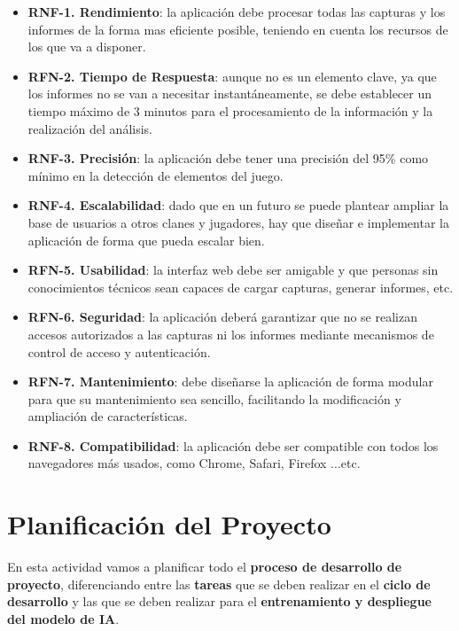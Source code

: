 \begin{itemize}
	\item \textbf{RNF-1. Rendimiento}: la aplicación debe procesar todas las capturas y los informes de la forma mas eficiente posible, teniendo en cuenta los recursos de los que va a disponer.
	\item \textbf{RFN-2. Tiempo de Respuesta}: aunque no es un elemento clave, ya que los informes no se van a necesitar instantáneamente, se debe establecer un tiempo máximo de 3 minutos para el procesamiento de la información y la realización del análisis.
	\item \textbf{RNF-3. Precisión}: la aplicación debe tener una precisión del 95\% como mínimo en la detección de elementos del juego.
	\item \textbf{RNF-4. Escalabilidad}: dado que en un futuro se puede plantear ampliar la base de usuarios a otros clanes y jugadores, hay que diseñar e implementar la aplicación de forma que pueda escalar bien.
	\item \textbf{RFN-5. Usabilidad}: la interfaz web debe ser amigable y que personas sin conocimientos técnicos sean capaces de cargar capturas, generar informes, etc.
	\item \textbf{RFN-6. Seguridad}: la aplicación deberá garantizar que no se realizan accesos autorizados a las capturas ni los informes mediante mecanismos de control de acceso y autenticación.
	\item \textbf{RFN-7. Mantenimiento}: debe diseñarse la aplicación de forma modular para que su mantenimiento sea sencillo, facilitando la modificación y ampliación de características.
	\item \textbf{RNF-8. Compatibilidad}: la aplicación debe ser compatible con todos los navegadores más usados, como Chrome, Safari, Firefox ...etc.
\end{itemize}

\section{Planificación del Proyecto}     
En esta actividad vamos a planificar todo el \textbf{proceso de desarrollo de proyecto}, diferenciando entre las \textbf{tareas} que se deben realizar en el \textbf{ciclo de desarrollo} y las que se deben realizar para el \textbf{entrenamiento y despliegue del modelo de IA}.

